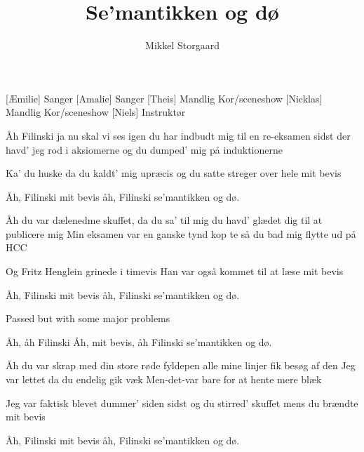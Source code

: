 \documentclass[a4paper,11pt]{article}
\title{Se'mantikken og dø}
\author{Mikkel Storgaard}
\begin{document}
\maketitle

\begin{roles}
[Æmilie] Sanger
[Amalie] Sanger
[Theis] Mandlig Kor/sceneshow
[Nicklas] Mandlig Kor/sceneshow
[Niels] Instruktør
\end{roles}

\begin{song}
%
Åh Filinski ja nu skal vi ses igen
du har indbudt mig til en re-eksamen
sidst der havd' jeg rod i aksiomerne
og du dumped' mig på induktionerne

%
Ka' du huske da du kaldt' mig upræcis
og du satte streger over hele mit bevis

%
Åh, Filinski
mit bevis
åh, Filinski
se'mantikken og dø.

%
Åh du var dælenedme skuffet, da du sa' til mig
du havd' glædet dig til at publicere mig
Min eksamen var en ganske tynd kop te
så du bad mig flytte ud på HCC

%
Og Fritz Henglein grinede i timevis
Han var også kommet til at læse mit bevis

%
Åh, Filinski
mit bevis
åh, Filinski
se'mantikken og dø.

 Passed but with some major problems


%
Åh, åh Filinski
Åh, mit bevis, åh Filinski
se'mantikken og dø.

%
Åh du var skrap med din store røde fyldepen
alle mine linjer fik besøg af den
Jeg var lettet da du endelig gik væk
Men-det-var bare for at hente mere blæk

%
Jeg var faktisk blevet dummer' siden sidst
og du stirred' skuffet mens du brændte mit bevis

%
Åh, Filinski
mit bevis
åh, Filinski
se'mantikken og dø.
\end{song}
\end{document}
